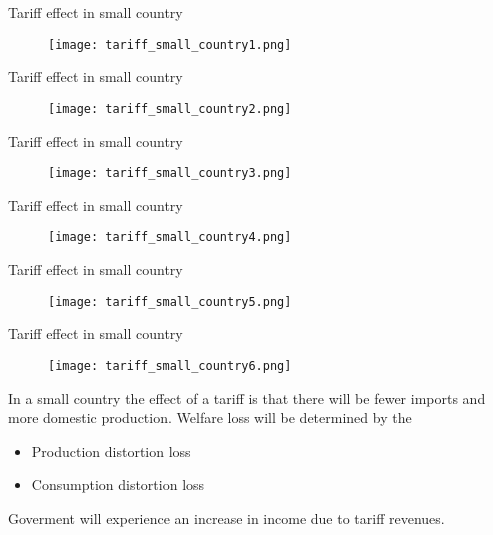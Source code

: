 \documentclass{beamer}
\begin{document}
\begin{frame}{Tariff effect in small country}
  \begin{figure}
    \texttt{[image: tariff\_small\_country1.png]}
  \end{figure}
\end{frame}

\begin{frame}{Tariff effect in small country}
  \begin{figure}
    \texttt{[image: tariff\_small\_country2.png]}
  \end{figure}
\end{frame}

\begin{frame}{Tariff effect in small country}
  \begin{figure}
    \texttt{[image: tariff\_small\_country3.png]}
  \end{figure}
\end{frame}

\begin{frame}{Tariff effect in small country}
  \begin{figure}
    \texttt{[image: tariff\_small\_country4.png]}
  \end{figure}
\end{frame}

\begin{frame}{Tariff effect in small country}
  \begin{figure}
    \texttt{[image: tariff\_small\_country5.png]}
  \end{figure}
\end{frame}

\begin{frame}{Tariff effect in small country}
  \begin{figure}
    \texttt{[image: tariff\_small\_country6.png]}
  \end{figure}
\end{frame}

\begin{frame}
  In a small country the effect of a tariff is that there will be fewer imports and more domestic production. 
  Welfare loss will be determined by the
  \begin{itemize}
    \item Production distortion loss
    \item Consumption distortion loss
  \end{itemize}
  \medskip
  Goverment will experience an increase in income due to tariff revenues.
\end{frame}
\end{document}
